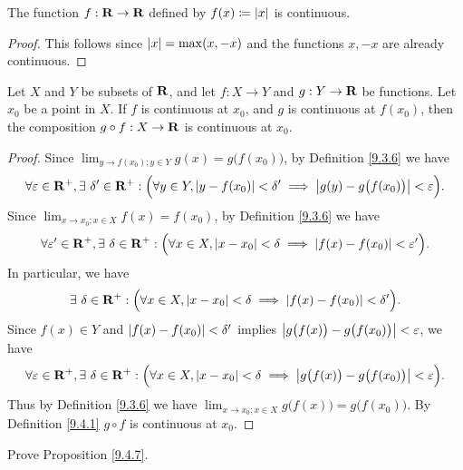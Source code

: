 \begin{proposition}\label{9.4.12}
    The function \(f : \mathbf{R} \to \mathbf{R}\) defined by \(f(x) \coloneqq \left\lvert x\right\rvert\) is continuous.
\end{proposition}

\begin{proof}
    This follows since \(\left\lvert x\right\rvert = \max(x, -x)\) and the functions \(x, -x\) are already continuous.
\end{proof}

\begin{proposition}\label{9.4.13}
    Let \(X\) and \(Y\) be subsets of \(\mathbf{R}\), and let \(f : X \to Y\) and \(g : Y \to \mathbf{R}\) be functions.
    Let \(x_0\) be a point in \(X\).
    If \(f\) is continuous at \(x_0\), and \(g\) is continuous at \(f(x_0)\), then the composition \(g \circ f : X \to \mathbf{R}\) is continuous at \(x_0\).
\end{proposition}

\begin{proof}
    Since \(\lim_{y \to f(x_0) ; y \in Y} g(x) = g\big(f(x_0)\big)\), by Definition \ref{9.3.6} we have
    \[
        \forall \varepsilon \in \mathbf{R}^+, \exists\ \delta' \in \mathbf{R}^+ : \Big(\forall y \in Y, \left\lvert y - f(x_0)\right\rvert < \delta' \implies \left\lvert g(y) - g\big(f(x_0)\big)\right\rvert < \varepsilon\Big).
    \]
    Since \(\lim_{x \to x_0 ; x \in X} f(x) = f(x_0)\), by Definition \ref{9.3.6} we have
    \[
        \forall \varepsilon' \in \mathbf{R}^+, \exists\ \delta \in \mathbf{R}^+ : \Big(\forall x \in X, \left\lvert x - x_0\right\rvert < \delta \implies \left\lvert f(x) - f(x_0)\right\rvert < \varepsilon'\Big).
    \]
    In particular, we have
    \[
        \exists\ \delta \in \mathbf{R}^+ : \Big(\forall x \in X, \left\lvert x - x_0\right\rvert < \delta \implies \left\lvert f(x) - f(x_0)\right\rvert < \delta'\Big).
    \]
    Since \(f(x) \in Y\) and \(\left\lvert f(x) - f(x_0)\right\rvert < \delta'\) implies \(\left\lvert g\big(f(x)\big) - g\big(f(x_0)\big)\right\rvert < \varepsilon\), we have
    \[
        \forall \varepsilon \in \mathbf{R}^+, \exists\ \delta \in \mathbf{R}^+ : \Big(\forall x \in X, \left\lvert x - x_0\right\rvert < \delta \implies \left\lvert g\big(f(x)\big) - g\big(f(x_0)\big)\right\rvert < \varepsilon\Big).
    \]
    Thus by Definition \ref{9.3.6} we have \(\lim_{x \to x_0 ; x \in X} g\big(f(x)\big) = g\big(f(x_0)\big)\).
    By Definition \ref{9.4.1} \(g \circ f\) is continuous at \(x_0\).
\end{proof}

\exercisesection

\begin{exercise}\label{ex 9.4.1}
    Prove Proposition \ref{9.4.7}.
\end{exercise}

